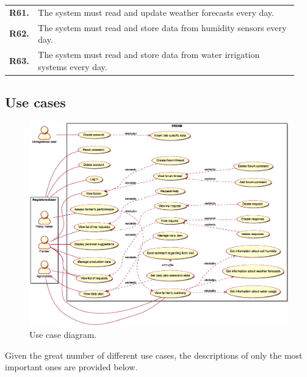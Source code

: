 \begin{longtable}{@{}p{0.06\linewidth} p{0.88\linewidth}}
		\textbf{R61.} & The system must read and update weather forecasts every day. \\
		\textbf{R62.} & The system must read and store data from humidity sensors every day. \\
		\textbf{R63.} & The system must read and store data from water irrigation systems every day. \\

		
	\bottomrule
\end{longtable}

\subsection{Use cases}
\begin{figure}[H]
    \centering
    \includegraphics[width=0.92\textheight, keepaspectratio, origin=c, angle=90]{diagrams/use_case}
    \caption{Use case diagram.}
    \label{fig:uc_diagram}
\end{figure}


Given the great number of different use cases, the descriptions of only the most important ones are provided below.

